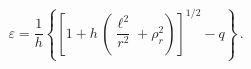 \begin{equation} \label{D6energy}
    \varepsilon = \frac{1}{h} \left\{
    \left[ 1 + h \,
    \left( \frac{\ell^2}{r^2} + \rho_r^2 \right)
    \right]^{1/2} - q \right\}
    \, .
\end{equation}

